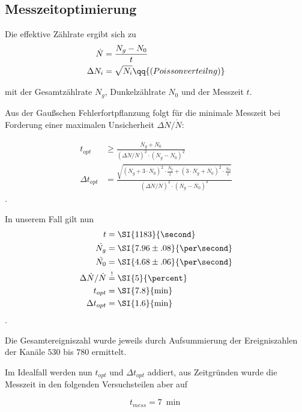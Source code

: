 \documentclass[slug=CS, room=Andreas-Schubert-Bau\,\ Labor\ 406,
supervisor=Juliane\ Volkmer, coursedate=29.\ 11.\ 2019]{../../Lab_Report_LaTeX/lab_report}
\begin{document}
\subsection{Messzeitoptimierung}
\label{sec:topt}

Die effektive Zählrate ergibt sich zu
\begin{align}
  \label{eq:countrate}
  \dot{N} &= \frac{N_g-N_0}{t} \\
  \Delta N_i &= \sqrt{N_i}\qq{(Poissonverteilng)}
\end{align}

mit der Gesamtzählrate \(N_g\), Dunkelzählrate \(N_0\) und der
Messzeit \(t\).

Aus der Gau\ss{}schen Fehlerfortpflanzung folgt f\"ur die minimale
Messzeit bei Forderung einer maximalen Unsicherheit
\(\Delta\dot{N}/\dot{N}\):

\begin{align}
  \label{eq:mtime}
  t_{opt} & \geq\frac{\dot{N_g} +
            \dot{N_0}}{(\Delta\dot{N}/\dot{N})^2\cdot (\dot{N_g} -
            \dot{N_0})^2} \\
  \Delta t_{opt} &=\frac{\sqrt{(\dot{N_g} +
                   3\cdot\dot{N_0})^2\cdot\frac{\dot{N_g}}{t}
                   + (3\cdot\dot{N_g} + \dot{N_0})^2\cdot\frac{\dot{N_0}}{t}}}{(\Delta\dot{N}/\dot{N})^2\cdot (\dot{N_g} -
            \dot{N_0})^3}
\end{align}.

In unserem Fall gilt nun
\begin{align}
  t &=\SI{1183}{\second} \\
  \dot{N_g} &=\SI{7.96\pm.08}{\per\second} \\
  \dot{N_0} &=\SI{4.68\pm.06}{\per\second} \\
  \Delta\dot{N}/\dot{N} &\overset{!}{=}\SI{5}{\percent} \\
  t_{opt} &=\SI{7.8}{\min} \\
  \Delta t_{opt} &=\SI{1.6}{\min}
\end{align}.

Die Gesamtereigniszahl wurde jeweils durch Aufsummierung der
Ereigniszahlen der Kan\"ale \(530\) bis \(780\) ermittelt.

Im Idealfall werden nun \(t_{opt}\) und \(\Delta t_{opt}\) addiert,
aus Zeitgr\"unden wurde die Messzeit in den folgenden Versuchsteilen
aber auf

\begin{equation}
  \label{eq:fmtime}
  t_{mess} = \SI{7}{\min}
\end{equation}
\end{document}
